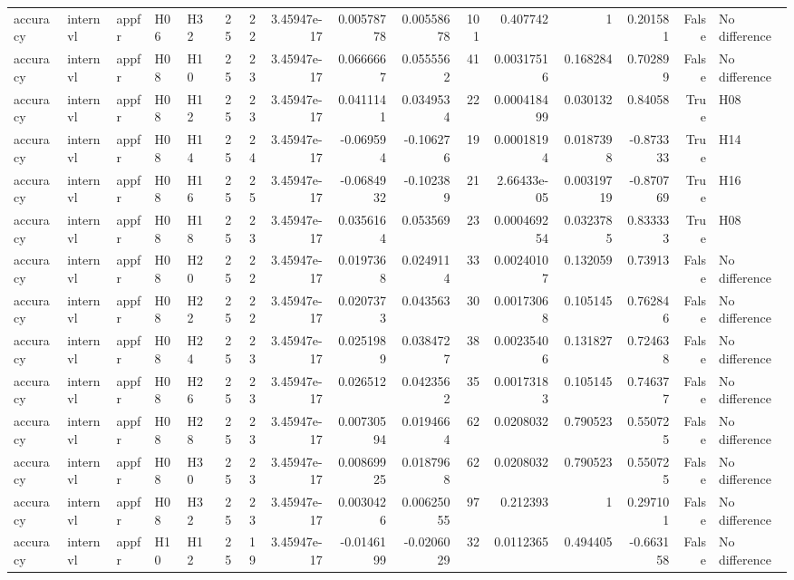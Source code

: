 \begin{longtable}{lllllrrrrrrrrrrl}
accuracy & internvl & appfr & H06 & H32 & 25 & 22 & 3.45947e-17 & 0.00578778 & 0.00558678 & 101 & 0.407742 & 1 & 0.201581 & False & No difference \\
accuracy & internvl & appfr & H08 & H10 & 25 & 23 & 3.45947e-17 & 0.0666667 & 0.0555562 & 41 & 0.00317516 & 0.168284 & 0.702899 & False & No difference \\
accuracy & internvl & appfr & H08 & H12 & 25 & 23 & 3.45947e-17 & 0.0411141 & 0.0349534 & 22 & 0.000418499 & 0.030132 & 0.84058 & True & H08 \\
accuracy & internvl & appfr & H08 & H14 & 25 & 24 & 3.45947e-17 & -0.069594 & -0.106276 & 19 & 0.00018194 & 0.0187398 & -0.873333 & True & H14 \\
accuracy & internvl & appfr & H08 & H16 & 25 & 25 & 3.45947e-17 & -0.0684932 & -0.102389 & 21 & 2.66433e-05 & 0.00319719 & -0.870769 & True & H16 \\
accuracy & internvl & appfr & H08 & H18 & 25 & 23 & 3.45947e-17 & 0.0356164 & 0.053569 & 23 & 0.000469254 & 0.0323785 & 0.833333 & True & H08 \\
accuracy & internvl & appfr & H08 & H20 & 25 & 22 & 3.45947e-17 & 0.0197368 & 0.0249114 & 33 & 0.00240107 & 0.132059 & 0.73913 & False & No difference \\
accuracy & internvl & appfr & H08 & H22 & 25 & 22 & 3.45947e-17 & 0.0207373 & 0.043563 & 30 & 0.00173068 & 0.105145 & 0.762846 & False & No difference \\
accuracy & internvl & appfr & H08 & H24 & 25 & 23 & 3.45947e-17 & 0.0251989 & 0.0384727 & 38 & 0.00235406 & 0.131827 & 0.724638 & False & No difference \\
accuracy & internvl & appfr & H08 & H26 & 25 & 23 & 3.45947e-17 & 0.026512 & 0.0423562 & 35 & 0.00173183 & 0.105145 & 0.746377 & False & No difference \\
accuracy & internvl & appfr & H08 & H28 & 25 & 23 & 3.45947e-17 & 0.00730594 & 0.0194664 & 62 & 0.0208032 & 0.790523 & 0.550725 & False & No difference \\
accuracy & internvl & appfr & H08 & H30 & 25 & 23 & 3.45947e-17 & 0.00869925 & 0.0187968 & 62 & 0.0208032 & 0.790523 & 0.550725 & False & No difference \\
accuracy & internvl & appfr & H08 & H32 & 25 & 23 & 3.45947e-17 & 0.0030426 & 0.00625055 & 97 & 0.212393 & 1 & 0.297101 & False & No difference \\
accuracy & internvl & appfr & H10 & H12 & 25 & 19 & 3.45947e-17 & -0.0146199 & -0.0206029 & 32 & 0.0112365 & 0.494405 & -0.663158 & False & No difference \\

\end{longtable}
